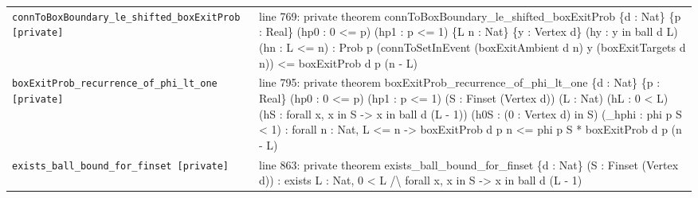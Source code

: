 \documentclass[10pt]{article}
\begin{document}
\begin{longtable}{>{\raggedright\arraybackslash}p{} >{\raggedright\arraybackslash}p{}}
\texttt{connToBoxBoundary\_\allowbreak{}le\_\allowbreak{}shifted\_\allowbreak{}boxExitProb [private]} & {\ttfamily\scriptsize line 769:\allowbreak{} private theorem connToBoxBoundary\_\allowbreak{}le\_\allowbreak{}shifted\_\allowbreak{}boxExitProb \{d :\allowbreak{} Nat\} \{p :\allowbreak{} Real\} (\allowbreak{}hp0 :\allowbreak{} 0 <=\allowbreak{} p)\allowbreak{} (\allowbreak{}hp1 :\allowbreak{} p <=\allowbreak{} 1)\allowbreak{} \{L n :\allowbreak{} Nat\} \{y :\allowbreak{} Vertex d\} (\allowbreak{}hy :\allowbreak{} y in ball d L)\allowbreak{} (\allowbreak{}hn :\allowbreak{} L <=\allowbreak{} n)\allowbreak{} :\allowbreak{} Prob p (\allowbreak{}connToSetInEvent (\allowbreak{}boxExitAmbient d n)\allowbreak{} y (\allowbreak{}boxExitTargets d n)\allowbreak{})\allowbreak{} <=\allowbreak{} boxExitProb d p (\allowbreak{}n -\allowbreak{} L)\allowbreak{}} \\[0.45em]
\texttt{boxExitProb\_\allowbreak{}recurrence\_\allowbreak{}of\_\allowbreak{}phi\_\allowbreak{}lt\_\allowbreak{}one [private]} & {\ttfamily\scriptsize line 795:\allowbreak{} private theorem boxExitProb\_\allowbreak{}recurrence\_\allowbreak{}of\_\allowbreak{}phi\_\allowbreak{}lt\_\allowbreak{}one \{d :\allowbreak{} Nat\} \{p :\allowbreak{} Real\} (\allowbreak{}hp0 :\allowbreak{} 0 <=\allowbreak{} p)\allowbreak{} (\allowbreak{}hp1 :\allowbreak{} p <=\allowbreak{} 1)\allowbreak{} (\allowbreak{}S :\allowbreak{} Finset (\allowbreak{}Vertex d)\allowbreak{})\allowbreak{} (\allowbreak{}L :\allowbreak{} Nat)\allowbreak{} (\allowbreak{}hL :\allowbreak{} 0 < L)\allowbreak{} (\allowbreak{}hS :\allowbreak{} forall x,\allowbreak{} x in S -\allowbreak{}> x in ball d (\allowbreak{}L -\allowbreak{} 1)\allowbreak{})\allowbreak{} (\allowbreak{}h0S :\allowbreak{} (\allowbreak{}0 :\allowbreak{} Vertex d)\allowbreak{} in S)\allowbreak{} (\allowbreak{}\_\allowbreak{}hphi :\allowbreak{} phi p S < 1)\allowbreak{} :\allowbreak{} forall n :\allowbreak{} Nat,\allowbreak{} L <=\allowbreak{} n -\allowbreak{}> boxExitProb d p n <=\allowbreak{} phi p S *\allowbreak{} boxExitProb d p (\allowbreak{}n -\allowbreak{} L)\allowbreak{}} \\[0.45em]
\texttt{exists\_\allowbreak{}ball\_\allowbreak{}bound\_\allowbreak{}for\_\allowbreak{}finset [private]} & {\ttfamily\scriptsize line 863:\allowbreak{} private theorem exists\_\allowbreak{}ball\_\allowbreak{}bound\_\allowbreak{}for\_\allowbreak{}finset \{d :\allowbreak{} Nat\} (\allowbreak{}S :\allowbreak{} Finset (\allowbreak{}Vertex d)\allowbreak{})\allowbreak{} :\allowbreak{} exists L :\allowbreak{} Nat,\allowbreak{} 0 < L /\allowbreak{}\textbackslash{} forall x,\allowbreak{} x in S -\allowbreak{}> x in ball d (\allowbreak{}L -\allowbreak{} 1)\allowbreak{}} \\[0.45em]

\end{longtable}
\end{document}
